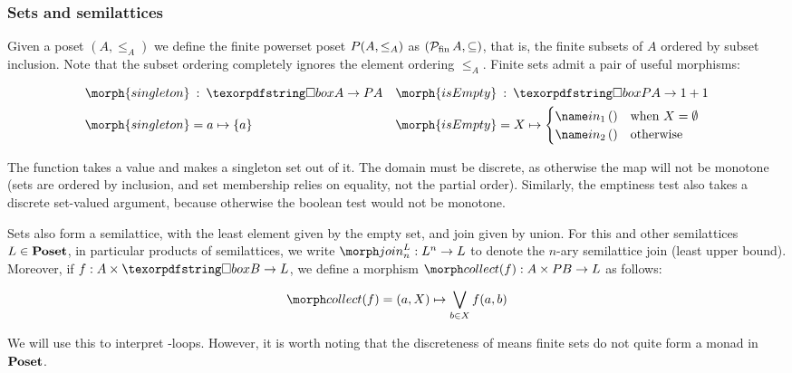 
\subsubsection{Sets and semilattices}

Given a poset $(A, \le_A)$ we define the finite powerset poset $P (A,
\le_A)$ as $(\mathcal{P}_{\mathrm{fin}}\, A, \subseteq)$, that is, the finite
subsets of $A$ ordered by subset inclusion.
%
Note that the subset ordering completely ignores the element ordering $\le_A$.
%
%
Finite sets admit a pair of useful morphisms:

\begin{align*}
  \morph{singleton} &\isa \iso A \to \pfinof A
  &
  \morph{isEmpty} &\isa \iso \pfinof A \to \terminalobject + \terminalobject
  \\
  \morph{singleton} &= a \mapsto \{a\}
  &
  \morph{isEmpty} &= X \mapsto 
  \begin{cases}
    \inj 1 () &\text{when }X = \emptyset\\
    \inj 2 () &\text{otherwise}
  \end{cases}
\end{align*}

\noindent
The  function takes a value and makes a singleton set out of
it. The domain must be discrete, as otherwise the map will not be monotone (sets
are ordered by inclusion, and set membership relies on equality, not the partial
order). Similarly, the emptiness test  also takes a discrete
set-valued argument, because otherwise the boolean test would not be monotone.

Sets also form a semilattice, with the least element given by the empty set, and
join given by union.
%
For this and other semilattices $L \in \textrm{\bfseries Poset}$, in particular products of
semilattices, we write $\morphjoin{L}{n} : L^n \to L$ to denote the $n$-ary
semilattice join (least upper bound).
%
Moreover, if $f : A \times \iso B \to L$, we define a morphism
$\pcollect{f} : A \times \pfinof{B} \to L$ as follows:

\begin{displaymath}
 \pcollect{f}  = (a, X) \mapsto \bigvee_{b \in X} f(a, b)
\end{displaymath}

\noindent
We will use this to interpret -loops. However, it is worth noting that
the discreteness of  means finite sets do not quite form a
monad in $\textrm{\bfseries Poset}$.

